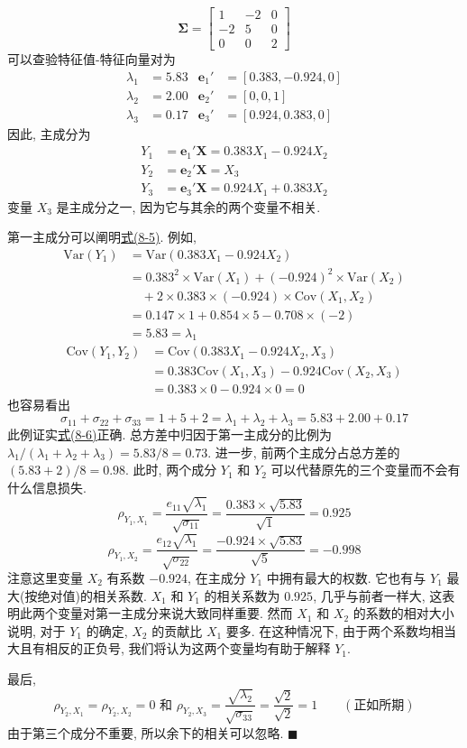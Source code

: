
\[
\boldsymbol{\Sigma}=\begin{bmatrix}1&-2&0\\-2&5&0\\0&0&2\end{bmatrix}
\]
可以查验特征值-特征向量对为
\[
\begin{aligned}
\lambda_1&=5.83 & \mathbf{e}_1'&=[0.383,-0.924,0]\\
\lambda_2&=2.00 & \mathbf{e}_2'&=[0,0,1]\\
\lambda_3&=0.17 & \mathbf{e}_3'&=[0.924,0.383,0]
\end{aligned}
\]
因此, 主成分为
\[
\begin{aligned}
Y_1&=\mathbf{e}_1'\mathbf{X}=0.383X_1-0.924X_2\\
Y_2&=\mathbf{e}_2'\mathbf{X}=X_3\\
Y_3&=\mathbf{e}_3'\mathbf{X}=0.924X_1+0.383X_2
\end{aligned}
\]
变量 $X_3$ 是主成分之一, 因为它与其余的两个变量不相关.

第一主成分可以阐明\hyperref[eq:8-5]{式(8-5)}. 例如,
\[
\begin{aligned}
\mathrm{Var}(Y_1)&=\mathrm{Var}(0.383X_1-0.924X_2)\\
&=0.383^2\times\mathrm{Var}(X_1)+(-0.924)^2\times\mathrm{Var}(X_2)\\
&\quad+2\times0.383\times(-0.924)\times\mathrm{Cov}(X_1,X_2)\\
&=0.147\times1+0.854\times5-0.708\times(-2)\\
&=5.83=\lambda_1
\end{aligned}
\]
\[
\begin{aligned}
\mathrm{Cov}(Y_1,Y_2)&=\mathrm{Cov}(0.383X_1-0.924X_2,X_3)\\
&=0.383\mathrm{Cov}(X_1,X_3)-0.924\mathrm{Cov}(X_2,X_3)\\
&=0.383\times0-0.924\times0=0
\end{aligned}
\]
也容易看出
\[
\sigma_{11}+\sigma_{22}+\sigma_{33}=1+5+2=\lambda_1+\lambda_2+\lambda_3=5.83+2.00+0.17
\]
此例证实\hyperref[eq:8-6]{式(8-6)}正确. 总方差中归因于第一主成分的比例为 $\lambda_1/(\lambda_1+\lambda_2+\lambda_3)=5.83/8=0.73$. 进一步, 前两个主成分占总方差的 $(5.83+2)/8=0.98$. 此时, 两个成分 $Y_1$ 和 $Y_2$ 可以代替原先的三个变量而不会有什么信息损失.
\[
\rho_{Y_1,X_1}=\frac{e_{11}\sqrt{\lambda_1}}{\sqrt{\sigma_{11}}}=\frac{0.383\times\sqrt{5.83}}{\sqrt{1}}=0.925
\]
\[
\rho_{Y_1,X_2}=\frac{e_{12}\sqrt{\lambda_1}}{\sqrt{\sigma_{22}}}=\frac{-0.924\times\sqrt{5.83}}{\sqrt{5}}=-0.998
\]
注意这里变量 $X_2$ 有系数 $-0.924$, 在主成分 $Y_1$ 中拥有最大的权数. 它也有与 $Y_1$ 最大(按绝对值)的相关系数. $X_1$ 和 $Y_1$ 的相关系数为 $0.925$, 几乎与前者一样大, 这表明此两个变量对第一主成分来说大致同样重要. 然而 $X_1$ 和 $X_2$ 的系数的相对大小说明, 对于 $Y_1$ 的确定, $X_2$ 的贡献比 $X_1$ 要多. 在这种情况下, 由于两个系数均相当大且有相反的正负号, 我们将认为这两个变量均有助于解释 $Y_1$.

最后,
\[
\rho_{Y_2,X_1}=\rho_{Y_2,X_2}=0 \text{ 和 } \rho_{Y_2,X_3}=\frac{\sqrt{\lambda_2}}{\sqrt{\sigma_{33}}}=\frac{\sqrt{2}}{\sqrt{2}}=1\qquad(\text{正如所期})
\]
由于第三个成分不重要, 所以余下的相关可以忽略. \hfill$\blacksquare$

